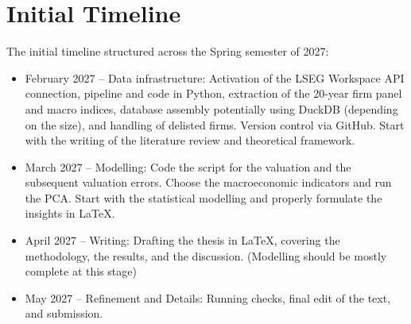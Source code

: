 \documentclass[11pt, a4paper]{article}
\begin{document}
\section{Initial Timeline}
The initial timeline structured across the Spring semester of 2027:

\begin{itemize}
    \item February 2027 -- Data infrastructure: Activation of the LSEG Workspace API connection, pipeline and code in Python, extraction of the 20-year firm panel and macro indices, database assembly potentially using DuckDB (depending on the size), and handling of delisted firms. Version control via GitHub. Start with the writing of the literature review and theoretical framework.
    \item March 2027 -- Modelling: Code the script for the valuation and the subsequent valuation errors. Choose the macroeconomic indicators and run the PCA. Start with the statistical modelling and properly formulate the insights in \LaTeX.
    \item April 2027 -- Writing: Drafting the thesis in \LaTeX, covering the methodology, the results, and the discussion. (Modelling should be mostly complete at this stage)
    \item May 2027 -- Refinement and Details: Running checks, final edit of the text, and submission.
\end{itemize}
\end{document}
